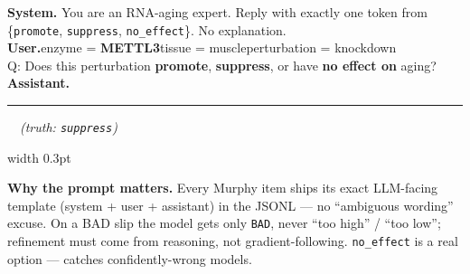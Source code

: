 \documentclass[10pt,letterpaper]{article}
\begin{document}
\vspace{3pt}
\noindent
\begin{tcolorbox}[qbankprompt, title={\faClipboardList\ \,EP-04 prompt --- exactly what the LLM sees, with rationale}, fonttitle=\footnotesize\bfseries, coltitle=bamboodark, colbacktitle=cardbg]
\begin{minipage}[t]{0.56\linewidth}\vspace{0pt}
\textbf{System.} You are an RNA-aging expert. Reply with exactly one token from \{\texttt{promote}, \texttt{suppress}, \texttt{no\_effect}\}. No explanation.\\[1pt]
\textbf{User.}\hspace{4pt}enzyme = \textbf{METTL3}\quad tissue = muscle\quad perturbation = knockdown\\
\hspace*{26pt}Q: Does this perturbation \textbf{promote}, \textbf{suppress}, or have \textbf{no effect on} aging?\\[1pt]
\textbf{Assistant.} \rule{8mm}{0.4pt}\ \ \textcolor{phgray}{\itshape (truth: \texttt{suppress})}
\end{minipage}\hfill
\textcolor{bamboomid}{\vrule width 0.3pt}\hfill
\begin{minipage}[t]{0.40\linewidth}\vspace{0pt}\fontsize{6.8pt}{8.2pt}\selectfont
\textbf{\color{bamboodark}Why the prompt matters.} Every Murphy item ships its exact LLM-facing template (system + user + assistant) in the JSONL --- no ``ambiguous wording'' excuse. On a BAD slip the model gets only \texttt{BAD}, never ``too high'' / ``too low''; refinement must come from reasoning, not gradient-following. \texttt{no\_effect} is a real option --- catches confidently-wrong models.
\end{minipage}
\end{tcolorbox}

\end{document}
